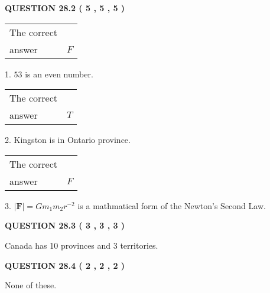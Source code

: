 \documentclass[12pt]{article}
\begin{document}
{\textbf{\Large{QUESTION
28.2 
 (           5 ,           5 ,           5 )
}}}
  
  
 
 
\noindent{}

 
\noindent\begin{tabular}{|l|l|}\hline The correct & \\
          answer &  %
$F$ \\ \hline \end{tabular}
1. $ %
53$ is an  %
even number.
 
\noindent\begin{tabular}{|l|l|}\hline The correct & \\
          answer &  %
$T$ \\ \hline \end{tabular}
2.  %
Kingston is in  %
Ontario province.
 
\noindent\begin{tabular}{|l|l|}\hline The correct & \\
          answer &  %
$F$ \\ \hline \end{tabular}
3.  %
$\left| \mathbf{F}\right| =Gm_1m_2r^{-2}$ is a mathmatical form of  %
the Newton's Second Law.
 
 
 
  
\vspace{0.2in}
  
{\textbf{\Large{QUESTION
28.3 
 (           3 ,           3 ,           3 )
}}}
  
  
 
 
\noindent{}
 
 
Canada has  %
10 provinces and  %
3 territories.
 
 
 
 
  
\vspace{0.2in}
  
{\textbf{\Large{QUESTION
28.4 
 (           2 ,           2 ,           2 )
}}}
  
  
 
 
\noindent{}
 
 
 None of these.
 
 
 
\end{document}
